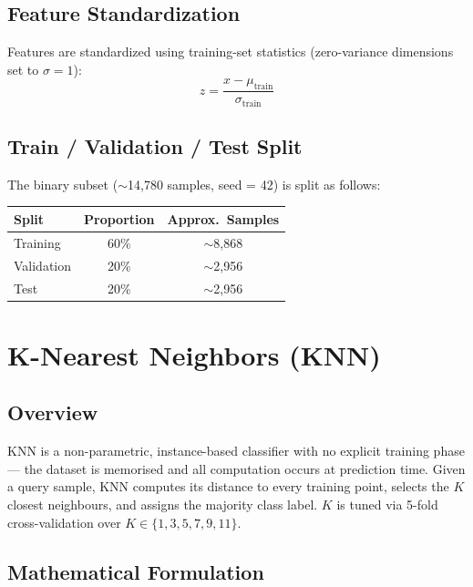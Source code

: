 \documentclass[11pt,a4paper]{article}
\begin{document}
\subsection{Feature Standardization}
Features are standardized using training-set statistics (zero-variance dimensions set to $\sigma=1$):
\[
z = \frac{x - \mu_{\text{train}}}{\sigma_{\text{train}}}
\]

\subsection{Train / Validation / Test Split}
The binary subset ($\sim$14,780 samples, seed = 42) is split as follows:

\vspace{4pt}
\begin{center}
\begin{tabular}{lcc}
\toprule
\textbf{Split} & \textbf{Proportion} & \textbf{Approx.\ Samples} \\
\midrule
Training   & 60\% & $\sim$8,868 \\
Validation & 20\% & $\sim$2,956 \\
Test       & 20\% & $\sim$2,956 \\
\bottomrule
\end{tabular}
\end{center}

\section{K-Nearest Neighbors (KNN)}

\subsection{Overview}
KNN is a non-parametric, instance-based classifier with no explicit training phase — the dataset is memorised and all computation occurs at prediction time. Given a query sample, KNN computes its distance to every training point, selects the $K$ closest neighbours, and assigns the majority class label. $K$ is tuned via 5-fold cross-validation over $K \in \{1, 3, 5, 7, 9, 11\}$.

\subsection{Mathematical Formulation}
\end{document}
